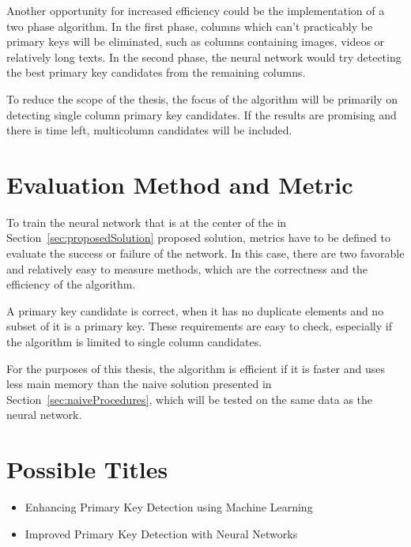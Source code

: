 \documentclass[a4paper]{article}
\begin{document}
Another opportunity for increased efficiency could be the implementation of a two phase algorithm. In the first phase, columns which can't practicably be primary keys will be eliminated, such as columns containing images, videos or relatively long texts. In the second phase, the neural network would try detecting the best primary key candidates from the remaining columns.

To reduce the scope of the thesis, the focus of the algorithm will be primarily on detecting single column primary key candidates. If the results are promising and there is time left, multicolumn candidates will be included.


\section{Evaluation Method and Metric}
To train the neural network that is at the center of the in Section~\ref{sec:proposedSolution} proposed solution, metrics have to be defined to evaluate the success or failure of the network. In this case, there are two favorable and relatively easy to measure methods, which are the correctness and the efficiency of the algorithm.

A primary key candidate is correct, when it has no duplicate elements and no subset of it is a primary key. These requirements are easy to check, especially if the algorithm is limited to single column candidates.

For the purposes of this thesis, the algorithm is efficient if it is faster and uses less main memory than the naive solution presented in Section~\ref{sec:naiveProcedures}, which will be tested on the same data as the neural network.


\section{Possible Titles}
\begin{itemize}
  \item Enhancing Primary Key Detection using Machine Learning
  \item Improved Primary Key Detection with Neural Networks
\end{itemize}
\end{document}
